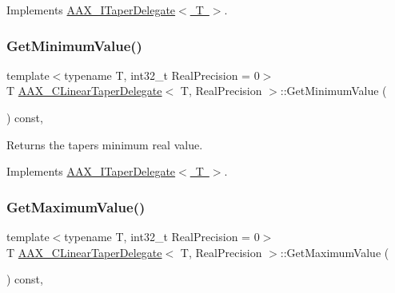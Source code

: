 Implements \mbox{\hyperlink{a01881_a80ce054ca716147155fe0682adf4e469}{A\+A\+X\+\_\+\+I\+Taper\+Delegate$<$ T $>$}}.

\mbox{\label{a01493_aa8874bf8cb7b62ae363cb3d9587efb12}} 
\subsubsection{\texorpdfstring{GetMinimumValue()}{GetMinimumValue()}}
{\footnotesize\ttfamily template$<$typename T, int32\+\_\+t Real\+Precision = 0$>$ \\
T \mbox{\hyperlink{a01493}{A\+A\+X\+\_\+\+C\+Linear\+Taper\+Delegate}}$<$ T, Real\+Precision $>$\+::Get\+Minimum\+Value (\begin{DoxyParamCaption}{ }\end{DoxyParamCaption}) const\hspace{0.3cm}{\ttfamily [inline]}, {\ttfamily [virtual]}}



Returns the taper\textquotesingle{}s minimum real value. 



Implements \mbox{\hyperlink{a01881_ac51bda25adc6f4ce320c0dd41fa332c7}{A\+A\+X\+\_\+\+I\+Taper\+Delegate$<$ T $>$}}.

\mbox{\label{a01493_a52dccdec4565f1057a4a5b304fc51161}} 
\subsubsection{\texorpdfstring{GetMaximumValue()}{GetMaximumValue()}}
{\footnotesize\ttfamily template$<$typename T, int32\+\_\+t Real\+Precision = 0$>$ \\
T \mbox{\hyperlink{a01493}{A\+A\+X\+\_\+\+C\+Linear\+Taper\+Delegate}}$<$ T, Real\+Precision $>$\+::Get\+Maximum\+Value (\begin{DoxyParamCaption}{ }\end{DoxyParamCaption}) const\hspace{0.3cm}{\ttfamily [inline]}, {\ttfamily [virtual]}}



